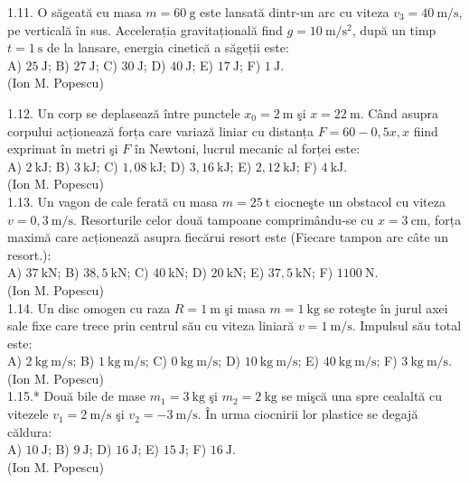 1.11. O săgeată cu masa $m=60 \mathrm{~g}$ este lansată dintr-un arc cu viteza $v_{3}=40 \mathrm{~m} / \mathrm{s}$, pe verticală în sus. Accelerația gravitațională find $g=10 \mathrm{~m} / \mathrm{s}^{2}$, după un timp $t=1 \mathrm{~s}$ de la lansare, energia cinetică a săgeții este:\\ A) $25 \mathrm{~J}$; B) $27 \mathrm{~J}$; C) $30 \mathrm{~J}$; D) $40 \mathrm{~J}$; E) $17 \mathrm{~J}$; F) $1 \mathrm{~J}$.\\ (Ion M. Popescu)

1.12. Un corp se deplasează între punctele $x_{0}=2 \mathrm{~m}$ şi $x=22 \mathrm{~m}$. Când asupra corpului acționează forța care variază liniar cu distanța $F=60-0,5 x, x$ fiind exprimat în metri şi $F$ în Newtoni, lucrul mecanic al forței este:\\ A) $2 \mathrm{~kJ}$; B) $3 \mathrm{~kJ}$; C) $1,08 \mathrm{~kJ}$; D) $3,16 \mathrm{~kJ}$; E) $2,12 \mathrm{~kJ}$; F) $4 \mathrm{~kJ}$.\\ (Ion M. Popescu)\\

1.13. Un vagon de cale ferată cu masa $m=25 \mathrm{~t}$ ciocneşte un obstacol cu viteza $v=0,3 \mathrm{~m} / \mathrm{s}$. Resorturile celor două tampoane comprimându-se cu $x=3 \mathrm{~cm}$, forța maximă care acționează asupra fiecărui resort este (Fiecare tampon are câte un resort.):\\ A) $37 \mathrm{~kN}$; B) $38,5 \mathrm{~kN}$; C) $40 \mathrm{~kN}$; D) $20 \mathrm{~kN}$; E) $37,5 \mathrm{~kN}$; F) $1100 \mathrm{~N}$.\\ (Ion M. Popescu)\\

1.14. Un disc omogen cu raza $R=1 \mathrm{~m}$ şi masa $m=1 \mathrm{~kg}$ se roteşte în jurul axei sale fixe care trece prin centrul său cu viteza liniară $v=1 \mathrm{~m} / \mathrm{s}$. Impulsul său total este:\\ A) $2 \mathrm{~kg} \mathrm{~m} / \mathrm{s}$; B) $1 \mathrm{~kg} \mathrm{~m} / \mathrm{s}$; C) $0 \mathrm{~kg} \mathrm{~m} / \mathrm{s}$; D) $10 \mathrm{~kg} \mathrm{~m} / \mathrm{s}$; E) $40 \mathrm{~kg} \mathrm{~m} / \mathrm{s}$; F) $3 \mathrm{~kg} \mathrm{~m} / \mathrm{s}$.\\ (Ion M. Popescu)\\

1.15.* Două bile de mase $m_{1}=3 \mathrm{~kg}$ şi $m_{2}=2 \mathrm{~kg}$ se mişcă una spre cealaltă cu vitezele $v_{1}=2 \mathrm{~m} / \mathrm{s}$ şi $v_{2}=-3 \mathrm{~m} / \mathrm{s}$. În urma ciocnirii lor plastice se degajă căldura:\\ A) $10 \mathrm{~J}$; B) $9 \mathrm{~J}$; D) $16 \mathrm{~J}$; E) $15 \mathrm{~J}$; F) $16 \mathrm{~J}$.\\ (Ion M. Popescu)\\


